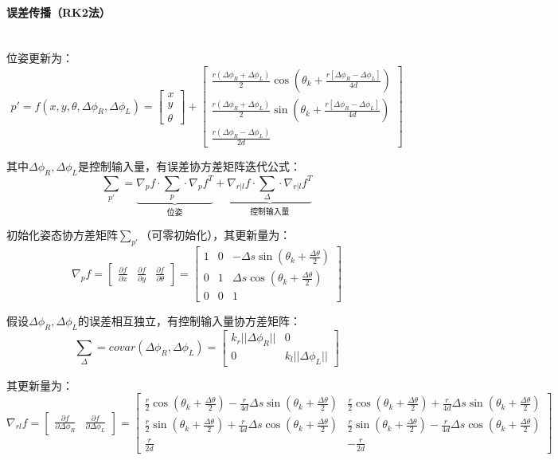 \documentclass[
12pt, %
a4paper, 
oneside, %
headinclude,footinclude, %
]{scrartcl}
\begin{document}
\paragraph{误差传播（RK2法）}\label{sec:error back}~\\

位姿更新为：
$$
p' = f(x, y, \theta, \Delta\phi_R, \Delta\phi_L) = 
\begin{bmatrix} x \\ y \\ \theta \end{bmatrix} + 
\begin{bmatrix} \frac{r(\Delta\phi_R + \Delta\phi_L)}{2} \cos(\theta_k + \frac{r[\Delta\phi_R - \Delta\phi_L]}{4d}) \\ \frac{r(\Delta\phi_R + \Delta\phi_L)}{2} \sin(\theta_k + \frac{r[\Delta\phi_R - \Delta\phi_L]}{4d}) \\ \frac{r(\Delta\phi_R - \Delta\phi_L)}{2d} \end{bmatrix}
$$

其中$ \Delta\phi_R,\Delta\phi_L $是控制输入量，有误差协方差矩阵迭代公式：
$$ \sum_{p'} = \underbrace{\nabla_p f \cdot \sum_p \cdot \nabla_p f^T}_{\text{位姿}} + \underbrace{\nabla_{r|l}f \cdot \sum_{\Delta} \cdot \nabla_{r|l}f^T}_{\text{控制输入量}} $$

初始化姿态协方差矩阵$ \sum_{p'} $（可零初始化），其更新量为：
$$
\nabla_p f = \begin{bmatrix}\frac{\partial f}{\partial x} & \frac{\partial f}{\partial y} & \frac{\partial f}{\partial \theta}\end{bmatrix} = 
\begin{bmatrix} 1 & 0 & -\Delta s \sin(\theta_k + \frac{\Delta\theta}{2}) \\ 0 & 1 & \Delta s \cos(\theta_k + \frac{\Delta\theta}{2}) \\ 0 & 0 & 1 \end{bmatrix}
$$

假设$ \Delta\phi_R,\Delta\phi_L $的误差相互独立，有控制输入量协方差矩阵：
$$ \sum_{\Delta} = covar(\Delta\phi_R, \Delta\phi_L) = \begin{bmatrix} k_r||\Delta\phi_R|| & 0 \\ 0 & k_l||\Delta\phi_L|| \end{bmatrix} $$

其更新量为：
$$ \nabla_{rl}f = \begin{bmatrix} \frac{\partial f}{\partial \Delta\phi_R} & \frac{\partial f}{\partial \Delta\phi_L} \end{bmatrix} = \begin{bmatrix} \frac{r}{2}\cos(\theta_k + \frac{\Delta\theta}{2}) - \frac{r}{4d}\Delta s \sin(\theta_k + \frac{\Delta\theta}{2}) & \frac{r}{2}\cos(\theta_k + \frac{\Delta\theta}{2}) + \frac{r}{4d}\Delta s \sin(\theta_k + \frac{\Delta\theta}{2}) \\ \frac{r}{2}\sin(\theta_k + \frac{\Delta\theta}{2}) + \frac{r}{4d}\Delta s \cos(\theta_k + \frac{\Delta\theta}{2}) & \frac{r}{2}\sin(\theta_k + \frac{\Delta\theta}{2}) - \frac{r}{4d}\Delta s \cos(\theta_k + \frac{\Delta\theta}{2}) \\ \frac{r}{2d} & -\frac{r}{2d} \end{bmatrix} $$
\end{document}
